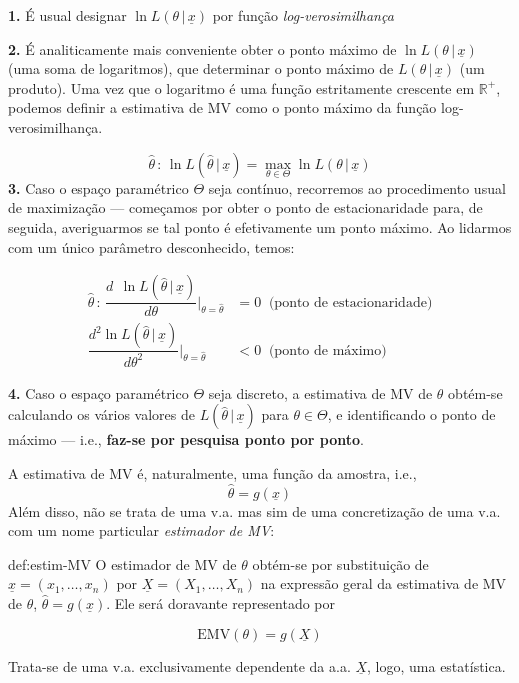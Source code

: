 \vspace{1 em}
\noindent\textbf{1.} É usual designar $\ln L(\theta\,|\, \underline{x})$ por função \textit{log-verosimilhança}

\vspace{1 em}
\noindent\textbf{2.} É analiticamente mais conveniente obter o ponto máximo de $\ln L(\theta\,|\, \underline{x})$ (uma soma de logaritmos), que determinar o ponto máximo de $L(\theta\,|\, \underline{x})$ (um produto). Uma vez que o logaritmo é uma função estritamente crescente em $\mathbb{R}^+$, podemos definir a estimativa de MV como o ponto máximo da função log-verosimilhança.

$$
    \boxed{\hat{\theta}\,:\, \ln L(\hat{\theta}\,|\, \underline{x}) = \underset{\theta \in \Theta}{\max} \ln L(\theta\,|\,\underline{x})}
$$
\noindent\textbf{3.} Caso o espaço paramétrico $\Theta$ seja contínuo, recorremos ao procedimento usual de maximização --- começamos por obter o ponto de estacionaridade para, de seguida, averiguarmos se tal ponto é efetivamente um ponto máximo. Ao lidarmos com um único parâmetro desconhecido, temos:

$$
    \begin{aligned}
        \hat{\theta}\,:\, \dfrac{d\;\, \ln L(\hat{\theta}\,|\, \underline{x})}{d\theta}\Biggr|_{\theta = \hat{\theta}} &= 0\;\; \text{(ponto de estacionaridade)}\\[4pt]
        \dfrac{d^2 \ln L(\hat{\theta}\,|\, \underline{x})}{d\theta^2}\Biggr|_{\theta = \hat{\theta}} &< 0 \;\; \text{(ponto de máximo)}
    \end{aligned}
$$

\vspace{0.5em}
\noindent\textbf{4.} Caso o espaço paramétrico $\Theta$ seja discreto, a estimativa de MV de $\theta$ obtém-se calculando os vários valores de $L(\hat{\theta}\,|\, \underline{x})$ para $\theta \in \Theta$, e identificando o ponto de máximo --- i.e., \textbf{faz-se por pesquisa ponto por ponto}.

\vspace{1 em}
\noindent A estimativa de MV é, naturalmente, uma função da amostra, i.e.,
$$
    \hat{\theta} = g(\underline{x})
$$
\noindent Além disso, não se trata de uma v.a. mas sim de uma concretização de uma v.a. com um nome particular \textit{estimador de MV}:

\begin{theo}{def:estim-MV}\label{def:estim-MV}
    \noindent O estimador de MV de $\theta$ obtém-se por substituição de $\underline{x} = (x_1, \dots, x_n)$ por $\underline{X} = (X_1, \dots, X_n)$ na expressão geral da estimativa de MV de $\theta$, $\hat{\theta} = g(\underline{x})$. Ele será doravante representado por

    $$
        \boxed{\text{EMV}(\theta) = g(\underline{X})}
    $$

    \noindent Trata-se de uma v.a. exclusivamente dependente da a.a. $\underline{X}$, logo, uma estatística.
\end{theo}

